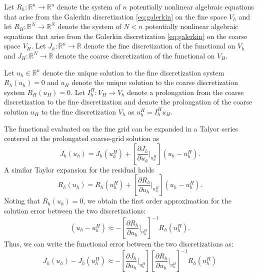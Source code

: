 \documentclass{article}
\begin{document}
Let $R_h: \mathbb{R}^n \to \mathbb{R}^n$ denote the
system of $n$ potentially nonlinear algebraic
equations that arise from the Galerkin discretization
\eqref{eq:galerkin} on the fine space $V_h$ and
let $R_H: \mathbb{R}^N \to \mathbb{R}^N$ denote the
system of $N < n$ potentially nonlinear algebraic
equations that arise from the Galerkin discretization
\eqref{eq:galerkin} on the coarse space $V_H$.
Let $J_h: \mathbb{R}^n \to \mathbb{R}$ denote the
fine discretization of the functional on $V_h$ and
$J_H: \mathbb{R}^N \to \mathbb{R}$ denote the coarse
discretization of the functional on $V_H$.

Let $u_h \in \mathbb{R}^n$ denote the unique solution
to the fine discretization system $R_h(u_h) = 0$ and
$u_H$ denote the unique solution to the coarse
discretization system $R_H(u_H) = 0$. Let
$I^H_h: V_H \to V_h$ denote a prolongation from the
coarse discretization to the fine discretization
and denote the prolongation of the coarse solution
$u_H$ to the fine discretization $V_h$ as
$u^H_h = I^H_h u_H$.

The functional evaluated on the fine grid can be expanded
in a Talyor series centered at the prolongated
coarse-grid solution as
%
\begin{equation}
J_h(u_h) = J_h(u_h^H) +
\left[ \frac{\partial J_h}{\partial u_h} \biggr|_{u_h^H} \right]
(u_h - u_h^H).
\label{eq:functional_taylor}
\end{equation}
%
A similar Taylor expansion for the residual holds
%
\begin{equation}
R_h(u_h) = R_h(u_h^H) +
\left[ \frac{\partial R_h}{\partial u_h} \biggr|_{u_h^H} \right]
(u_h - u_h^H).
\label{eq:residual_taylor}
\end{equation}
%
Noting that $R_h(u_h) = 0$, we obtain the first
order approximation for the solution error between
the two discretizations:
\begin{equation}
(u_h - u_h^H) \approx
- \left[ \frac{\partial R_h}{\partial u_h} \biggr|_{u_h^H} \right]^{-1}
R_h(u_h^H).
\end{equation}
%
Thus, we can write the functional error between
the two discretizations as:
%
\begin{equation}
J_h(u_h) - J_h(u_h^H) \approx
-\left[ \frac{\partial J_h}{\partial u_h} \biggr|_{u_h^H} \right]
\left[ \frac{\partial R_h}{\partial u_h} \biggr|_{u_h^H} \right]^{-1}
R_h(u_h^H)
\end{equation}
\end{document}
